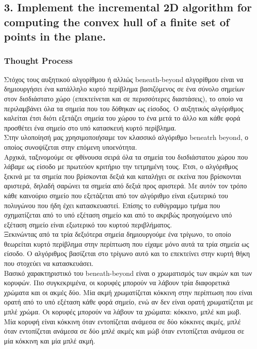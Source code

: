 \documentclass[12pt]{article}
\begin{document}
\pagebreak

\subsection*{3. Implement the incremental 2D algorithm for computing the convex hull of a
finite set of points in the plane.}

\subsubsection*{Thought Process}

Στόχος τους αυξητικού αλγορίθμου ή αλλιώς beneath-beyond αλγορίθμου είναι να δημιουργήσει ένα κατάλληλο κυρτό περίβλημα βασιζόμενος σε ένα σύνολο σημείων στον δισδιάστατο χώρο (επεκτείνεται και σε περισσότερες διαστάσεις), το οποίο να περιλαμβάνει όλα τα σημεία που του δόθηκαν ως είσοδος. Ο αυξητικός αλγόριθμος καλείται έτσι διότι εξετάζει σημεία του χώρου το ένα μετά το άλλο και κάθε φορά προσθέτει ένα σημείο στο υπό κατασκευή κυρτό περίβλημα. \\

Στην υλοποίησή μας χρησιμοποιήσαμε τον κλασσικό αλγόριθμο beneatrh beyond, ο οποίος συνοψίζεται στην επόμενη υποενότητα. \\

Αρχικά, ταξινομούμε σε φθίνουσα σειρά όλα τα σημεία του δισδιάστατου χώρου που λάβαμε ως είσοδο με πρωτεύον κριτήριο την τετμημένη τους. Έτσι, ο αλγόριθμος ξεκινά με τα σημεία που βρίσκονται δεξιά και καταλήγει σε εκείνα που βρίσκονται αριστερά, δηλαδή σαρώνει τα σημεία από δεξιά προς αριστερά. Με αυτόν τον τρόπο κάθε καινούριο σημείο που εξετάζεται από τον αλγόριθμο είναι εξωτερικό του πολυγώνου που ήδη έχει κατασκευαστεί. Επίσης το ευθύγραμμο τμήμα που σχηματίζεται από το υπό εξέταση σημείο και από το ακριβώς προηγούμενο υπό εξέταση σημείο είναι εξωτερικό του κυρτού περιβλήματος. \\

Ξεκινώντας από τα τρία δεξιότερα σημεία δημιουργούμε ένα τρίγωνο, το οποίο θεωρείται κυρτό περίβλημα στην περίπτωση που είχαμε μόνο αυτά τα τρία σημεία ως είσοδο. Ο αλγόριθμος βασίζεται στο τρίγωνο αυτό και το επεκτείνει στην κυρτή θήκη που στοχεύει να κατασκευάσει. \\

Βασικό χαρακτηριστικό του beneath-beyond είναι ο χρωματισμός των ακμών και των κορυφών. Πιο συγκεκριμένα, οι κορυφές μπορούν να λάβουν τρία διαφορετικά χρώματα και οι ακμές δύο. Μία ακμή χρωματίζεται κόκκινη στην περίπτωση που είναι ορατή από το υπό εξέταση κάθε φορά σημείο, ενώ αν δεν είναι ορατή χρωματίζεται με μπλέ χρώμα. Οι κορυφές μπορούν να λάβουν τα χρώματα: κόκκινο, μπλέ και μωβ. Μία κορυφή είναι κόκκινη όταν εντοπίζεται ανάμεσα σε δύο κόκκινες ακμές, μπλέ όταν εντοπίζεται ανάμεσα σε δύο μπλέ ακμές και μώβ όταν εντοπίζεται ανάμεσα σε μία κόκκινη και μία μπλέ ακμή. \\
\end{document}
